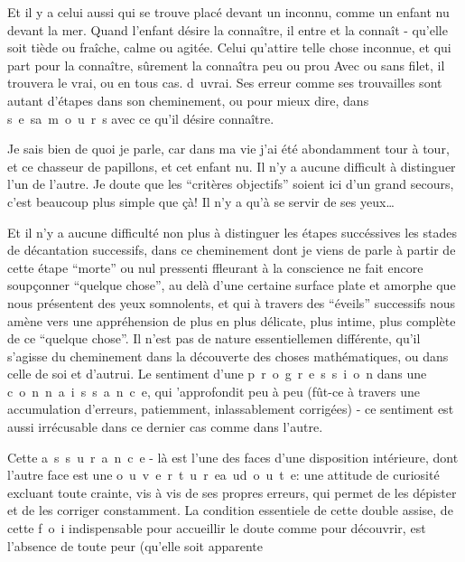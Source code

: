 Et il y a celui aussi qui se trouve placé devant un inconnu, comme un enfant nu devant la mer. Quand l'enfant désire la connaître, il entre et la connaît - qu'elle soit tiède ou fraîche, calme ou agitée. Celui qu'attire telle chose inconnue, et qui part pour la connaître, sûrement la connaîtra peu ou prou Avec ou sans filet, il trouvera le vrai, ou en tous cas. \mbox{d u}\quad vrai. Ses erreur comme ses trouvailles sont autant d'étapes dans son cheminement, ou pour mieux dire, dans \mbox{s e s}\quad \mbox{a m o u r s} avec ce qu'il désire connaître.

Je sais bien de quoi je parle, car dans ma vie j'ai été abondamment tour à tour, et ce chasseur de papillons, et cet enfant nu. Il n'y a aucune difficult à distinguer l'un de l'autre. Je doute que les ``critères objectifs'' soient ici d'un grand secours, c'est beaucoup plus simple que çà! Il n'y a qu'à se servir de ses yeux\ldots

Et il n'y a aucune difficulté non plus à distinguer les étapes succéssives\unsure{,} les stades de décantation successifs, dans ce cheminement dont je viens de parle à partir de cette étape ``morte'' ou nul pressenti ffleurant à la conscience ne fait encore soupçonner ``quelque chose'', au delà d'une certaine surface plate et amorphe que nous présentent des yeux somnolents, et qui à travers des ``éveils'' successifs nous amène vers une appréhension de plus en plus délicate, plus intime, plus complète de ce ``quelque chose''. Il n'est pas de nature essentiellemen différente, qu'il s'agisse du cheminement dans la découverte des choses mathématiques, ou dans celle de soi et d'autrui. Le sentiment d'une \mbox{p r o g r e s s i o n} dans une \mbox{c o n n a i s s a n c e}, qui 'approfondit peu à peu (fût-ce à travers une accumulation d'erreurs, patiemment, inlassablement corrigées) - ce sentiment est aussi irrécusable dans ce dernier cas comme dans l'autre.

Cette \mbox{a s s u r a n c e} - là est l'une des faces d'une disposition intérieure, dont l'autre face est une \mbox{o u v e r t u r e}\quad \mbox{a u}\quad \mbox{d o u t e}: une attitude de curiosité excluant toute crainte, vis à vis de ses propres erreurs, qui permet de les dépister et de les corriger constamment. La condition essentiele de cette double assise, de cette \mbox{f o i} indispensable pour accueillir le doute comme pour découvrir, est l'absence de toute peur (qu'elle soit apparente

